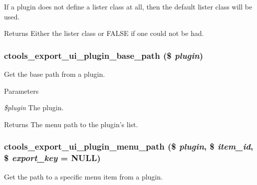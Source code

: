 If a plugin does not define a lister class at all, then the default lister class will be used.

\begin{DoxyReturn}{Returns}
Either the lister class or FALSE if one could not be had. 
\end{DoxyReturn}
\hypertarget{export-ui_8inc_a94d99f3e0f94a8263e97b182214bdf6a}{
\subsubsection[{ctools\_\-export\_\-ui\_\-plugin\_\-base\_\-path}]{\setlength{\rightskip}{0pt plus 5cm}ctools\_\-export\_\-ui\_\-plugin\_\-base\_\-path (\$ {\em plugin})}}
\label{export-ui_8inc_a94d99f3e0f94a8263e97b182214bdf6a}
Get the base path from a plugin.


\begin{DoxyParams}{Parameters}
\item[{\em \$plugin}]The plugin.\end{DoxyParams}
\begin{DoxyReturn}{Returns}
The menu path to the plugin's list. 
\end{DoxyReturn}
\hypertarget{export-ui_8inc_ab235aba2e08d3bad82db3f42a7fd6d42}{
\subsubsection[{ctools\_\-export\_\-ui\_\-plugin\_\-menu\_\-path}]{\setlength{\rightskip}{0pt plus 5cm}ctools\_\-export\_\-ui\_\-plugin\_\-menu\_\-path (\$ {\em plugin}, \/  \$ {\em item\_\-id}, \/  \$ {\em export\_\-key} = {\ttfamily NULL})}}
\label{export-ui_8inc_ab235aba2e08d3bad82db3f42a7fd6d42}
Get the path to a specific menu item from a plugin.


